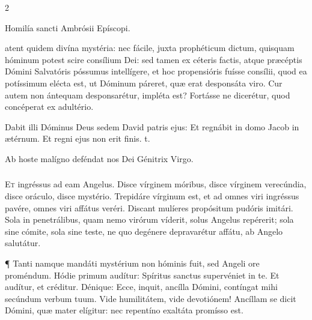 \documentclass[9pt,twoside]{extarticle}
\begin{document}
\begin{multicols}{2}
\begin{center}Homilía sancti Ambrósii Epíscopi.\\
\end{center}
atent quidem divína mystéria: nec fácile, juxta prophéticum dictum, quisquam hóminum potest scire consílium Dei: sed tamen ex céteris factis, atque præcéptis Dómini Salvatóris póssumus intellígere, et hoc propensióris fuísse consílii, quod ea potíssimum elécta est, ut Dóminum páreret, quæ erat desponsáta viro. Cur autem non ántequam desponsarétur, impléta est? Fortásse ne dicerétur, quod concéperat ex adultério.

\begin{tightlist}{}
\item {} Dabit illi Dóminus Deus sedem David patris ejus: \textred{*} Et regnábit in domo Jacob in ætérnum.  Et regni ejus non erit finis. t.
\item {\small {} Ab hoste malígno deféndat nos Dei Génitrix Virgo.}
\item {}
\end{tightlist}

\subsubsection*{\center {}}
\lettrine{E}t ingréssus ad eam Angelus. Disce vírginem móribus, disce vírginem verecúndia, disce oráculo, disce mystério. Trepidáre vírginum est, et ad omnes viri ingréssus pavére, omnes viri affátus veréri. Discant mulíeres propósitum pudóris imitári. Sola in penetrálibus, quam nemo virórum víderit, solus Angelus repérerit; sola sine cómite, sola sine teste, ne quo degénere depravarétur affátu, ab Angelo salutátur.

¶ Tanti namque mandáti mystérium non hóminis fuit, sed Angeli ore proméndum. Hódie primum audítur: Spíritus sanctus supervéniet in te. Et audítur, et créditur. Dénique: Ecce, inquit, ancílla Dómini, contíngat mihi secúndum verbum tuum. Vide humilitátem, vide devotiónem! Ancíllam se dicit Dómini, quæ mater elígitur: nec repentíno exaltáta promísso est.


\end{multicols}
\end{document}
